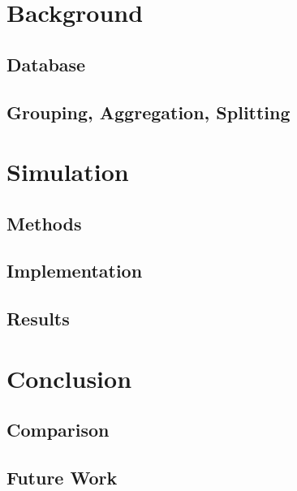\newpage
\section{Background}

\subsection{Database}
\subsection{Grouping, Aggregation, Splitting} \label{Grouping}

\section{Simulation}

\subsection{Methods}
\subsection{Implementation}
\subsection{Results}

\section{Conclusion}
\subsection{Comparison}
\subsection{Future Work}